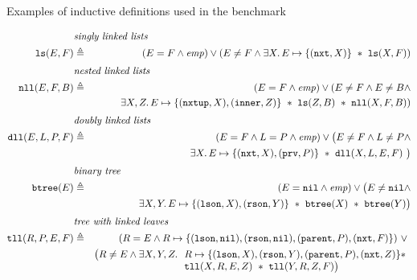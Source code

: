 \documentclass[twoside,11pt]{article}
\newcommand{\sep}{.\,}
\newcommand{\posep}{*}
\newcommand{\points}{\mapsto}
\newcommand{\nil}{\mathtt{nil}}
\newcommand{\ls}{\mathtt{ls}}
\newcommand{\dll}{\mathtt{dll}}
\newcommand{\nll}{\mathtt{nll}}
\begin{document}
\begin{table}
\caption{Examples of inductive definitions used in the benchmark}
\label{tab:RD}
\begin{eqnarray}
%
\lefteqn{\textit{singly linked lists}} \nonumber \\
\ls(E,F) & \triangleq & (E=F\land\mathit{emp}) \lor (E\neq F \land 
\exists X\sep E\points\{(\texttt{nxt},X)\}\ \posep\ \ls(X,F)) 
\\[1mm]
%  
\lefteqn{\textit{nested linked lists}} \nonumber \\ 
\nll(E,F,B) & \triangleq & (E=F\land\mathit{emp}) \lor (E\neq F \land E\neq B \land \\
&& \exists X,Z\sep E\points\{(\texttt{nxtup},X),(\texttt{inner},Z)\}\ \posep\ \ls(Z,B)\ \posep\ \nll(X,F,B)) \nonumber
\\[1mm]
%  
\lefteqn{\textit{doubly linked lists}} \nonumber \\ 
\dll(E, L, P, F) & \triangleq & (E=F\land L=P\land \mathit{emp}) \lor \big( E\neq F \land L\neq P \land \\
&& \exists X\sep E\points \{(\texttt{nxt},X),(\texttt{prv},P)\}\ \posep\ \dll(X,L,E,F)\ \big)\nonumber
\\[1mm]
%  
\lefteqn{\textit{binary tree}} \nonumber \\ 
\mathtt{btree}(E) & \triangleq & (E=\nil\land \mathit{emp}) \lor \big( E\neq \nil \land 
\\
&& \exists X,Y\sep E\points \{(\texttt{lson},X),(\texttt{rson},Y)\}\ \posep\ \mathtt{btree}(X)\ \posep\ \mathtt{btree}(Y)\big)
\nonumber 
\\[1mm]
%  
\lefteqn{\textit{tree with linked leaves}} \nonumber \\ 
\mathtt{tll}(R,P,E,F) & \triangleq & (R=E \land R\points \{(\texttt{lson},\nil),(\texttt{rson},\nil),(\texttt{parent},P),(\texttt{nxt},F)\}) ~\lor~ \\
&&\big( R\neq E \land \exists X,Y,Z\sep 
\begin{array}[t]{l}
R\points \{(\texttt{lson},X),(\texttt{rson},Y),(\texttt{parent},P),(\texttt{nxt},Z)\} \posep \\
\mathtt{tll}(X,R,E,Z)\ \posep\ \mathtt{tll}(Y,R,Z,F)\big)
\end{array} \nonumber  
\end{eqnarray}
\end{table}
\end{document}
